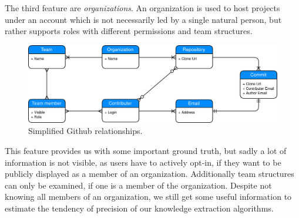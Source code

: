 The third feature are \emph{organizations}.
An organization is used to host projects under an account which is not necessarily led by a single natural person, but rather supports roles with different permissions and team structures.

\begin{figure}[H]
    \includegraphics[scale=0.3]{./graphs/github-data-structure}
    \centering
    \caption{Simplified Github relationships.}\label{fig:github-relationship}
\end{figure}

This feature provides us with some important ground truth, but sadly a lot of information is not visible, as users have to actively opt-in, if they want to be publicly displayed as a member of an organization.
Additionally team structures can only be examined, if one is a member of the organization.
Despite not knowing all members of an organization, we still get some useful information to estimate the tendency of precision of our knowledge extraction algorithms.
